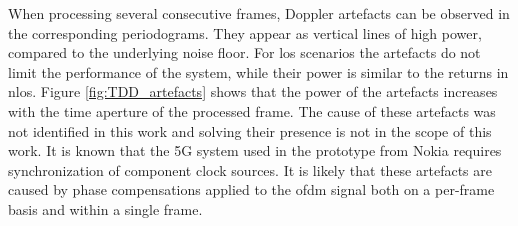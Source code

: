 		When processing several consecutive frames, Doppler artefacts can be observed in the corresponding periodograms.
		They appear as vertical lines of high power, compared to the underlying noise floor.
		For \gls{los} scenarios the artefacts do not limit the performance of the system, while their power is similar to the returns in \gls{nlos}.
		Figure \ref{fig:TDD_artefacts} shows that the power of the artefacts increases with the time aperture of the processed frame.
		The cause of these artefacts was not identified in this work and solving their presence is not in the scope of this work. It is known that the 5G system used in the prototype from Nokia requires synchronization of component clock sources.
		It is likely that these artefacts are caused by phase compensations applied to the \gls{ofdm} signal both on a per-frame basis and within a single frame.
